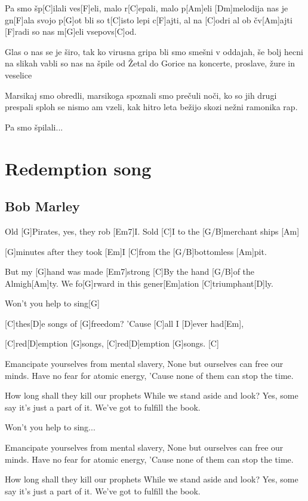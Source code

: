 \documentclass[a4paper,12pt]{article}
\begin{document}
\begin{multicols}{2}
\begin{guitar}
Pa smo šp[C]ilali ves[F]eli, malo r[C]epali, malo p[Am]eli
[Dm]melodija nas je gn[F]ala svojo p[G]ot        
bli so t[C]isto lepi c[F]ajti, al na [C]odri al ob čv[Am]ajti
[F]radi so nas m[G]eli vsepovs[C]od.


Glas o nas se je širo, tak ko virusna gripa
bli smo smešni v oddajah, še bolj hecni na slikah
vabli so nas na špile od Žetal do Gorice 
na koncerte, proslave, žure in veselice


Marsikaj smo obredli, marsikoga spoznali
smo prečuli noči, ko so jih drugi prespali
sploh se nismo am vzeli, kak hitro leta bežijo
skozi nežni ramonika rap.


Pa smo špilali...


\end{guitar}
\section{Redemption song}
\subsection*{Bob Marley}
\begin{guitar}

Old [G]Pirates, yes, they rob [Em7]I.
Sold [C]I to the [G/B]merchant ships [Am]

[G]minutes after they took [Em]I 
[C]from the [G/B]bottomless [Am]pit.


But my [G]hand was made [Em7]strong
[C]By the hand [G/B]of the Almigh[Am]ty.
We fo[G]rward in this gener[Em]ation [C]triumphant[D]ly.


Won't you help to sing[G]   \

[C]thes[D]e songs of [G]freedom?
'Cause [C]all I [D]ever had[Em],    

[C]red[D]emption [G]songs,
[C]red[D]emption [G]songs. [C]
   
   
Emancipate yourselves from mental slavery,
None but ourselves can free our minds.
Have no fear for atomic energy,
'Cause none of them can stop the time.


How long shall they kill our prophets
While we stand aside and look?
Yes, some say it's just a part of it.
We've got to fulfill the book.

Won't you help to sing...

Emancipate yourselves from mental slavery,
None but ourselves can free our minds.
Have no fear for atomic energy,
'Cause none of them can stop the time.


How long shall they kill our prophets
While we stand aside and look?
Yes, some say it's just a part of it.
We've got to fulfill the book.



\end{guitar}
\end{multicols}
\end{document}
